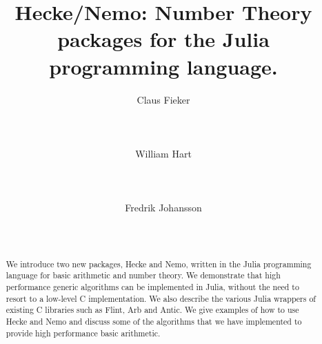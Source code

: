 \documentclass{sig-alternate-05-2015}
\begin{document}

\newtheorem{alg}{Algorithm}
\newtheorem{definition}{Definition}
\newtheorem{Assertion}{Assertion}

\makeatletter
\def\Ddots{\mathinner{\mkern1mu\raise\p@
\vbox{\kern7\p@\hbox{.}}\mkern2mu
\raise4\p@\hbox{.}\mkern2mu\raise7\p@\hbox{.}\mkern1mu}}
\makeatother

\title{Hecke/Nemo: Number Theory packages for the Julia programming language.}

\author{
\alignauthor Claus Fieker\\
   \\
   \\
   \\
\alignauthor William Hart\\
   \\
   \\
   \\
\alignauthor Fredrik Johansson\\
   \\
   \\
}

\maketitle

\begin{abstract}
We introduce two new packages, Hecke and Nemo, written in the Julia programming language
for basic arithmetic and number theory. We demonstrate that high performance generic
algorithms can be implemented in Julia, without the need to resort to a low-level C
implementation. We also describe the various Julia wrappers of existing C libraries
such as Flint, Arb and Antic. We give examples of how to use Hecke and Nemo and discuss
some of the algorithms that we have implemented to provide high performance basic
arithmetic.
\end{abstract}
\end{document}
